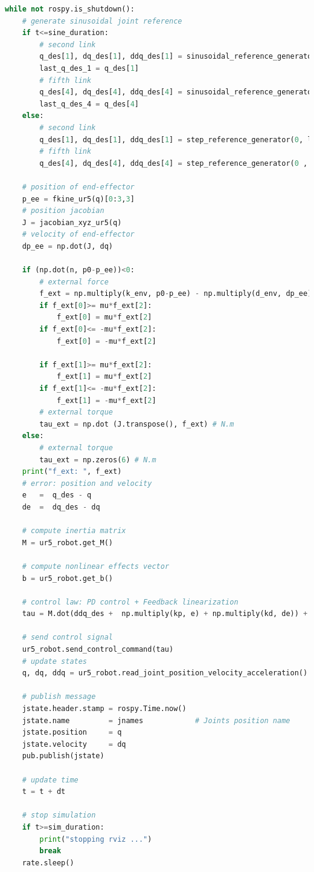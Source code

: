 \begin{lstlisting}[language=Python,caption={Move the second and fifth joint of UR5 robot with the required movement of activity 2.8.}, label={lst:inverse_dynamics_coulomb_friction}]
while not rospy.is_shutdown():
    # generate sinusoidal joint reference
    if t<=sine_duration:
        # second link
        q_des[1], dq_des[1], ddq_des[1] = sinusoidal_reference_generator(q0[1], 0.2, 1, t)
        last_q_des_1 = q_des[1]
        # fifth link
        q_des[4], dq_des[4], ddq_des[4] = sinusoidal_reference_generator(q0[4], 0.4, 1.5, t)  
        last_q_des_4 = q_des[4]  
    else:
        # second link
        q_des[1], dq_des[1], ddq_des[1] = step_reference_generator(0, last_q_des_1)
        # fifth link
        q_des[4], dq_des[4], ddq_des[4] = step_reference_generator(0 , last_q_des_4)

    # position of end-effector
    p_ee = fkine_ur5(q)[0:3,3]
    # position jacobian
    J = jacobian_xyz_ur5(q)    
    # velocity of end-effector
    dp_ee = np.dot(J, dq)

    if (np.dot(n, p0-p_ee))<0:
        # external force
        f_ext = np.multiply(k_env, p0-p_ee) - np.multiply(d_env, dp_ee) # N
        if f_ext[0]>= mu*f_ext[2]:
            f_ext[0] = mu*f_ext[2]
        if f_ext[0]<= -mu*f_ext[2]:
            f_ext[0] = -mu*f_ext[2] 

        if f_ext[1]>= mu*f_ext[2]:
            f_ext[1] = mu*f_ext[2]
        if f_ext[1]<= -mu*f_ext[2]:
            f_ext[1] = -mu*f_ext[2] 
        # external torque 
        tau_ext = np.dot (J.transpose(), f_ext) # N.m
    else:
        # external torque 
        tau_ext = np.zeros(6) # N.m
    print("f_ext: ", f_ext)
    # error: position and velocity
    e 	=  q_des - q
    de 	=  dq_des - dq    

    # compute inertia matrix
    M = ur5_robot.get_M()

    # compute nonlinear effects vector
    b = ur5_robot.get_b()   

    # control law: PD control + Feedback linearization
    tau = M.dot(ddq_des +  np.multiply(kp, e) + np.multiply(kd, de)) + b + tau_ext
    
    # send control signal   
    ur5_robot.send_control_command(tau)
    # update states
    q, dq, ddq = ur5_robot.read_joint_position_velocity_acceleration()

    # publish message
    jstate.header.stamp = rospy.Time.now()
    jstate.name 		= jnames			# Joints position name
    jstate.position 	= q
    jstate.velocity 	= dq
    pub.publish(jstate)

    # update time
    t = t + dt

    # stop simulation
    if t>=sim_duration:
        print("stopping rviz ...")
        break
    rate.sleep()
\end{lstlisting}

